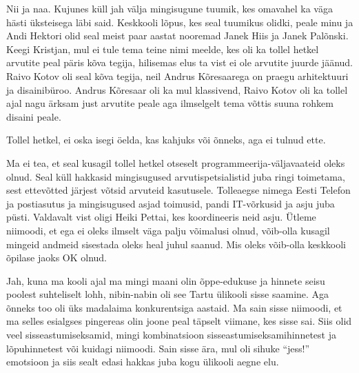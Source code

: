 
Nii ja naa. Kujunes küll jah välja mingisugune tuumik, kes  omavahel ka väga 
hästi üksteisega läbi said. Keskkooli lõpus, kes seal tuumikus olidki, peale 
minu ja Andi Hektori  olid seal meist paar aastat 
nooremad Janek Hiis ja Janek 
Palõnski. Keegi Kristjan, mul ei tule  tema teine 
nimi meelde, kes oli ka tollel hetkel arvutite peal päris kõva tegija, 
hilisemas elus ta vist ei ole arvutite juurde jäänud. Raivo 
Kotov oli seal kõva tegija, neil Andrus 
Kõresaarega  on praegu arhitektuuri ja 
disainibüroo. Andrus Kõresaar oli ka mul klassivend,  Raivo Kotov oli ka tollel 
ajal nagu ärksam just arvutite peale aga ilmselgelt tema võttis suuna rohkem 
disaini peale. 


Tollel hetkel, ei oska isegi öelda, kas kahjuks või õnneks, aga ei tulnud ette. 


Ma ei tea, et seal kusagil tollel hetkel otseselt programmeerija-väljavaateid 
oleks olnud. Seal küll hakkasid mingisugused arvutispetsialistid juba ringi 
toimetama, sest ettevõtted järjest võtsid arvuteid kasutusele. Tolleaegse nimega 
Eesti Telefon ja postiasutus ja mingisugused asjad toimusid, pandi 
 IT-võrkusid ja asju juba püsti. Valdavalt vist oligi Heiki 
Pettai, kes  koordineeris  neid asju. Ütleme niimoodi, et ega ei oleks ilmselt 
väga palju võimalusi olnud,  võib-olla kusagil mingeid andmeid sisestada oleks 
heal juhul saanud. Mis oleks võib-olla keskkooli õpilase jaoks OK 
olnud. 


Jah, kuna ma kooli ajal ma mingi maani olin õppe-edukuse ja hinnete seisu 
poolest suhteliselt lohh, nibin-nabin oli see Tartu ülikooli sisse saamine. Aga 
õnneks  too oli üks madalaima konkurentsiga aastaid. Ma sain sisse niimoodi, et 
ma selles esialgses pingereas olin joone peal täpselt viimane, kes sisse sai. 
Siis olid veel sisseastumiseksamid, mingi kombinatsioon 
sisseastumiseksamihinnetest ja lõpuhinnetest või kuidagi niimoodi. Sain sisse 
ära, mul oli sihuke \enquote{jess!} emotsioon ja siis sealt edasi hakkas juba 
kogu  ülikooli aegne elu. 

